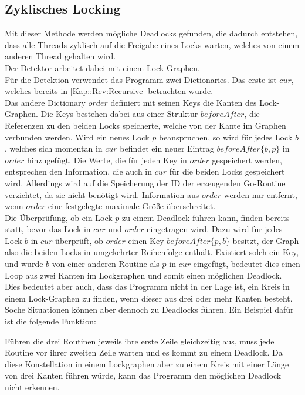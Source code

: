 \subsection{Zyklisches Locking}\label{Kap::Rev:Cyclic}
Mit dieser Methode werden mögliche Deadlocks gefunden, die dadurch entstehen,
dass alle Threads zyklisch auf die Freigabe eines Locks warten, welches von 
einem anderen Thread gehalten wird.\\ 
Der Detektor arbeitet dabei mit einem Lock-Graphen.\\
Für die Detektion verwendet das Programm zwei Dictionaries. Das erste ist $cur$, 
welches bereits in \ref{Kap::Rev:Recursive} betrachten wurde.\\
Das andere Dictionary $order$ definiert mit seinen Keys die Kanten des Lock-Graphen.
Die Keys bestehen dabei aus einer Struktur $beforeAfter$, die Referenzen zu den beiden
Locks speicherte, welche von der Kante im Graphen verbunden werden.
Wird ein neues Lock $p$ beanspruchen, so wird für 
jedes Lock $b$, welches sich momentan in $cur$ befindet ein  
neuer Eintrag $beforeAfter\{b, p\}$ in $order$ hinzugefügt. 
Die Werte, die für jeden Key in $order$ gespeichert werden, entsprechen 
den Information, die auch in $cur$ für die beiden Locks gespeichert wird. Allerdings 
wird auf die Speicherung der ID der erzeugenden Go-Routine verzichtet, da sie 
nicht benötigt wird.
Information aus $order$ werden nur entfernt, wenn $order$ eine festgelegte 
maximale Größe überschreitet.\\ 
Die Überprüfung, ob ein Lock $p$ zu einem Deadlock führen kann, finden bereits statt,
bevor das Lock in $cur$ und $order$ eingetragen wird. Dazu wird für jedes Lock
$b$ in $cur$ überprüft,
ob $order$ einen Key $beforeAfter\{p, b\}$ besitzt, der Graph also die beiden 
Locks in 
umgekehrter Reihenfolge enthält. Existiert solch ein Key, und wurde $b$ 
von einer anderen Routine als $p$ in $cur$ eingefügt, bedeutet dies einen 
Loop aus zwei Kanten im Lockgraphen und somit einen möglichen Deadlock.\\
Dies bedeutet aber auch, dass das Programm nicht in der Lage ist, ein Kreis 
in einem Lock-Graphen zu finden, wenn dieser aus drei oder mehr Kanten besteht.
Soche Situationen können aber dennoch zu Deadlocks führen. Ein Beispiel dafür 
ist die folgende Funktion:
\begin{figure}[H]
    
\end{figure}
Führen die drei Routinen jeweils ihre erste Zeile gleichzeitig aus, muss jede 
Routine vor ihrer zweiten Zeile warten und es kommt zu einem Deadlock. Da diese
Konstellation in einem Lockgraphen aber zu einem Kreis mit einer Länge von drei 
Kanten führen würde, kann das Programm den möglichen Deadlock nicht erkennen.\\

